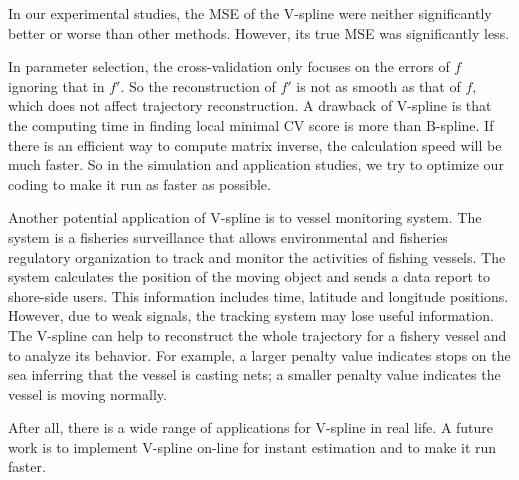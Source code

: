 In our experimental studies, the MSE of the V-spline were neither significantly better or worse than other methods. However, its true MSE was significantly less. 

In parameter selection, the cross-validation only focuses on the errors of $f$ ignoring that in $f'$. So the reconstruction of $f'$ is not as smooth as that of $f$, which does not affect trajectory reconstruction. A drawback of V-spline is that the computing time in finding local minimal CV score is more than B-spline. If there is an efficient way to compute matrix inverse, the calculation speed will be much faster. So in the simulation and application studies, we try to optimize our coding to make it run as faster as possible.

Another potential application of V-spline is to vessel monitoring system. The system is a fisheries surveillance that allows environmental and fisheries regulatory organization to track and monitor the activities of fishing vessels. The system calculates the position of the moving object and sends a data report to shore-side users. This information includes time, latitude and longitude positions. However, due to weak signals, the tracking system may lose useful information. The V-spline can help to reconstruct the whole trajectory for a fishery vessel and to analyze its behavior. For example, a larger penalty value indicates stops on the sea inferring that the vessel is casting nets; a smaller penalty value indicates the vessel is moving normally. 

After all, there is a wide range of applications for V-spline in real life. A future work is to implement V-spline on-line for instant estimation and to make it run faster. 

